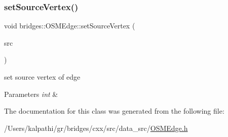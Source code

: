 \subsubsection{\texorpdfstring{setSourceVertex()}{setSourceVertex()}}
{\footnotesize\ttfamily void bridges\+::\+O\+S\+M\+Edge\+::set\+Source\+Vertex (\begin{DoxyParamCaption}\item[{int}]{src }\end{DoxyParamCaption})\hspace{0.3cm}{\ttfamily [inline]}}

set source vertex of edge


\begin{DoxyParams}{Parameters}
{\em int} & \\
\hline
\end{DoxyParams}


The documentation for this class was generated from the following file\+:\begin{DoxyCompactItemize}
\item 
/\+Users/kalpathi/gr/bridges/cxx/src/data\+\_\+src/\mbox{\hyperlink{_o_s_m_edge_8h}{O\+S\+M\+Edge.\+h}}\end{DoxyCompactItemize}
